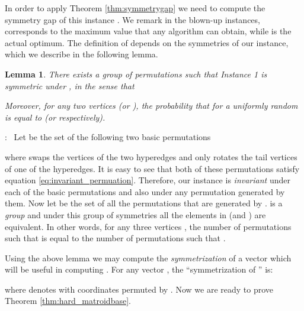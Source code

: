 \documentclass{article}[11pt]
\newtheorem{lemma}[theorem]{Lemma}
\renewenvironment{proof}{\noindent{\bf Proof}:~}{\\}
\begin{document}
In order to apply Theorem \ref{thm:symmetrygap} we need to compute the symmetry gap
of this instance .
We remark in the blown-up instances,  corresponds to the maximum value
that any algorithm can obtain, while  is the actual optimum.
The definition of  depends on the symmetries of our instance,
which we describe in the following lemma.



\begin{lemma}
\label{lem:symmetricgroups}
There exists a group  of permutations such that Instance 1
is symmetric under , in the sense that 

Moreover, for any two vertices  (or ), the probability that
 for a uniformly random  is equal to 
(or  respectively).
\end{lemma}

\begin{proof}
Let  be the set of the following two basic permutations

where  swaps the vertices of the two hyperedges and 
only rotates the tail vertices of  one of the hyperedges.
It is easy to see that both of these permutations satisfy equation
 \eqref{eq:invariant_permuation}. Therefore, our instance is {\em{invariant}}
under each of the basic permutations and also under any permutation generated by them.
Now let  be the set of all the permutations that are generated by .
 is a {\em group} and under this group of symmetries all the elements
in  (and ) are equivalent. In other words, for any three vertices ,
the number of permutations  such that  is equal to the
number of permutations such that .
\end{proof}

Using the above lemma we may compute the {\em{symmetrization}} of a vector 
which will be useful in computing  \cite{Vondrak09}.
For any vector , the ``symmetrization of ''  is:

where  denotes  with coordinates permuted by .
Now we are ready to prove Theorem \ref{thm:hard_matroidbase}.\\
\end{document}
